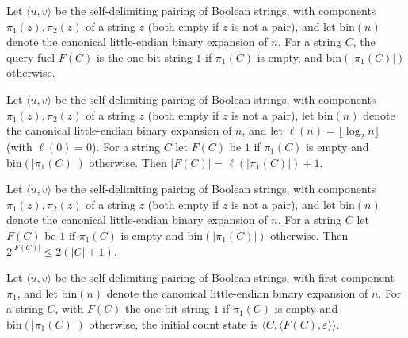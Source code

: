 \begin{definition}
\label{Complexity.ladner_queryFuel}
\leanok
{}
Let $\langle u,v\rangle$ be the self-delimiting pairing of Boolean strings, with components $\pi_1(z),\pi_2(z)$ of a string $z$ (both empty if $z$ is not a pair), and let $\mathrm{bin}(n)$ denote the canonical little-endian binary expansion of $n$. For a string $C$, the query fuel $F(C)$ is the one-bit string $1$ if
$\pi_1(C)$ is empty, and $\mathrm{bin}(|\pi_1(C)|)$ otherwise.
\end{definition}

\begin{theorem}
\label{Complexity.ladner_queryFuel_length}
\leanok
{}
Let $\langle u,v\rangle$ be the self-delimiting pairing of Boolean strings, with components $\pi_1(z),\pi_2(z)$ of a string $z$ (both empty if $z$ is not a pair), let $\mathrm{bin}(n)$ denote the canonical little-endian binary expansion of $n$, and let $\ell(n)=\lfloor\log_2 n\rfloor$ (with $\ell(0)=0$). For a string $C$ let $F(C)$ be $1$ if $\pi_1(C)$ is empty and
$\mathrm{bin}(|\pi_1(C)|)$ otherwise. Then $|F(C)|=\ell(|\pi_1(C)|)+1$.
\end{theorem}

\begin{theorem}
\label{Complexity.ladner_queryFuel_power_le}
\leanok
{}
Let $\langle u,v\rangle$ be the self-delimiting pairing of Boolean strings, with components $\pi_1(z),\pi_2(z)$ of a string $z$ (both empty if $z$ is not a pair), and let $\mathrm{bin}(n)$ denote the canonical little-endian binary expansion of $n$. For a string $C$ let $F(C)$ be $1$ if $\pi_1(C)$ is empty and
$\mathrm{bin}(|\pi_1(C)|)$ otherwise. Then $2^{|F(C)|}\le 2(|C|+1)$.
\end{theorem}

\begin{definition}
\label{Complexity.ladner_countInit}
\leanok
{}
Let $\langle u,v\rangle$ be the self-delimiting pairing of Boolean strings, with first component
$\pi_1$, and let $\mathrm{bin}(n)$ denote the canonical little-endian binary expansion of $n$. For a string $C$, with $F(C)$ the one-bit string $1$ if $\pi_1(C)$ is
empty and $\mathrm{bin}(|\pi_1(C)|)$ otherwise, the initial count state is
$\langle C,\langle F(C),\varepsilon\rangle\rangle$.
\end{definition}

